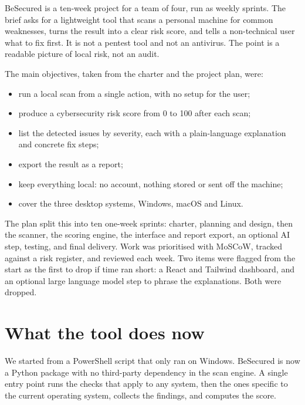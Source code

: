 \documentclass[11pt,a4paper]{article}
\begin{document}
BeSecured is a ten-week project for a team of four, run as weekly sprints. The
brief asks for a lightweight tool that scans a personal machine for common
weaknesses, turns the result into a clear risk score, and tells a non-technical
user what to fix first. It is not a pentest tool and not an antivirus. The point
is a readable picture of local risk, not an audit.

The main objectives, taken from the charter and the project plan, were:

\begin{itemize}
\item run a local scan from a single action, with no setup for the user;
\item produce a cybersecurity risk score from 0 to 100 after each scan;
\item list the detected issues by severity, each with a plain-language
  explanation and concrete fix steps;
\item export the result as a report;
\item keep everything local: no account, nothing stored or sent off the machine;
\item cover the three desktop systems, Windows, macOS and Linux.
\end{itemize}

The plan split this into ten one-week sprints: charter, planning and design, then
the scanner, the scoring engine, the interface and report export, an optional AI
step, testing, and final delivery. Work was prioritised with MoSCoW, tracked
against a risk register, and reviewed each week. Two items were flagged from the
start as the first to drop if time ran short: a React and Tailwind dashboard, and
an optional large language model step to phrase the explanations. Both were
dropped.

\section{What the tool does now}

We started from a PowerShell script that only ran on Windows. BeSecured is now a
Python package with no third-party dependency in the scan engine. A single entry
point runs the checks that apply to any system, then the ones specific to the
current operating system, collects the findings, and computes the score.
\end{document}
